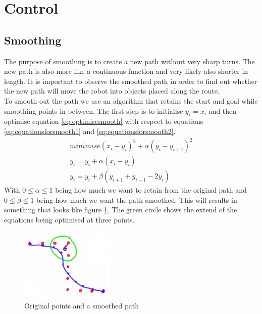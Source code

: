 \section{Control}
\subsection{Smoothing}
The purpose of smoothing is to create a new path without very sharp turns. The new path is also more like a continuous function and very likely also shorter in length. It is important to observe the smoothed path in order to find out whether the new path will move the robot into objects placed along the route.\\
To smooth out the path we use an algorithm that retains the start and goal while smoothing points in between. The first step is to initialise $y_i = x_i$ and then optimise equation \ref{eq:optimisesmooth} with respect to equations \ref{eq:equationsforsmooth1} and \ref{eq:equationsforsmooth2}.
\begin{gather}
minimise (x_i - y_i )^2 + \alpha(y_i - y_{i+1})^2
\label{eq:optimisesmooth} \\
y_i = y_i + \alpha(x_i - y_i)
\label{eq:equationsforsmooth1} \\
y_i = y_i + \beta(y_{i+1} + y_{i-1}-2y_i)
\label{eq:equationsforsmooth2}
\end{gather}
With $0\leq\alpha\leq1$ being how much we want to retain from the original path and $0\leq\beta\leq1$ being how much we want the path smoothed. This will results in something that looks like figure \ref{fig:pathsmooth}. The green circle shows the extend of the equations being optimised at three points.
\begin{figure}[H]
\centering
\includegraphics[width=0.4\textwidth]{billeder/pathsmoothed1}
\caption{Original points and a smoothed path}
\label{fig:pathsmooth}
\end{figure}

